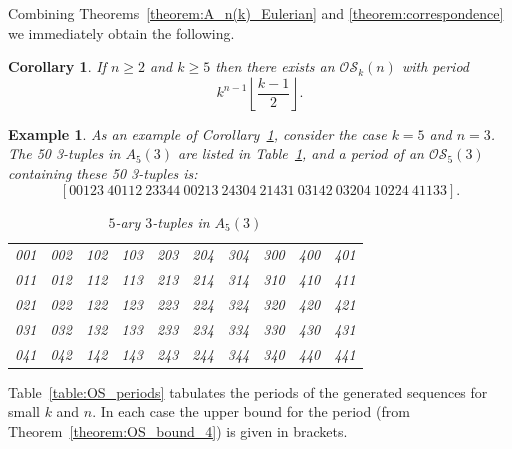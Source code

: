 \documentclass[a4paper,11pt]{article}
\newtheorem{corollary}[lemma]{Corollary}
\newtheorem{example}[lemma]{Example}
\begin{document}
Combining Theorems~\ref{theorem:A_n(k)_Eulerian} and \ref{theorem:correspondence} we immediately
obtain the following.

\begin{corollary}  \label{corollary:OSkn}
If $n\geq2$ and $k\geq5$ then there exists an $\mathcal{OS}_k(n)$ with period
\[k^{n-1}\left\lfloor\frac{k-1}{2}\right\rfloor.\]
\end{corollary}


\begin{example}
As an example of Corollary~\ref{corollary:OSkn}, consider the case $k=5$ and $n=3$.  The 50
3-tuples in $A_5(3)$ are listed in Table~\ref{table:5-ary_3_tuples}, and a period of an
$\mathcal{OS}_5(3)$ containing these 50 3-tuples is:
\[ [00123~40112~23344~00213~24304~21431~03142~03204~10224~41133]. \]

\begin{table}[htb]
\caption{$5$-ary $3$-tuples in $A_5(3)$} \label{table:5-ary_3_tuples}
\begin{center}

\begin{tabular}{|cc|cc|cc|cc|cc|}
\hline
001 & 002 & 102 & 103 & 203 & 204 & 304 & 300 & 400 & 401  \\
011 & 012 & 112 & 113 & 213 & 214 & 314 & 310 & 410 & 411  \\
021 & 022 & 122 & 123 & 223 & 224 & 324 & 320 & 420 & 421  \\
031 & 032 & 132 & 133 & 233 & 234 & 334 & 330 & 430 & 431  \\
041 & 042 & 142 & 143 & 243 & 244 & 344 & 340 & 440 & 441  \\
\hline
\end{tabular}
\end{center}
\end{table}
\end{example}


Table~\ref{table:OS_periods} tabulates the periods of the generated sequences for small $k$ and
$n$.   In each case the upper bound for the period (from Theorem~\ref{theorem:OS_bound_4}) is given
in brackets.
\end{document}
